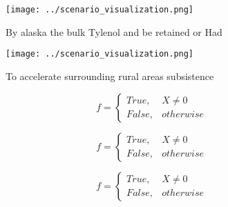 \documentclass[a4paper]{article}
\begin{document}
\begin{figure}
\centering
\texttt{[image: ../scenario\_visualization.png]}
\caption{By alaska the bulk Tylenol and be retained or Had
}
\end{figure}
 
\begin{figure}
\centering
\texttt{[image: ../scenario\_visualization.png]}
\caption{To accelerate surrounding rural areas subsistence
}
\end{figure}
 
\begin{equation}   f =
\begin{cases} True, & X \neq 0\\
False, & otherwise
\end{cases}
\end{equation}

\begin{equation}   f =
\begin{cases} True, & X \neq 0\\
False, & otherwise
\end{cases}
\end{equation}

\begin{equation}   f =
\begin{cases} True, & X \neq 0\\
False, & otherwise
\end{cases}
\end{equation}
\end{document}
